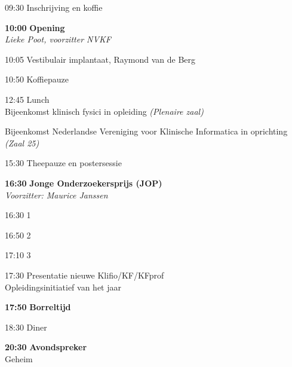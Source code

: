 \documentclass[a4paper,10pt]{report}
\begin{document}
\begin{multicols*}{3}

\begin{packed_enum}
    \item[09:30] Inschrijving en koffie
        \vfill
    \item[\textbf{10:00}] \textbf{Opening}\\\textit{Lieke Poot, voorzitter NVKF}
        \vfill
    \item[10:05] Vestibulair implantaat, Raymond van de Berg
        \vfill
    \item[10:50] Koffiepauze
        \vfill
    \item[{\color{Blue}{\textbf{11:20}}}] {}
        \vfill
    \item[12:45] Lunch\\
        {\small Bijeenkomst klinisch fysici in opleiding \hfill\textit{(Plenaire zaal)}}\\
        {\small Bijeenkomst Nederlandse Vereniging voor Klinische Informatica
        in oprichting \hfill\textit{(Zaal 25)}\strut}
        \vfill
    \item[{\color{Blue}{\textbf{14:00}}}] {}
        \vfill
    \item[15:30] Theepauze en postersessie 
        \vfill
    \item[\textbf{16:30}] {\textbf{Jonge Onderzoekersprijs (JOP)}}\\\textit{Voorzitter: Maurice Janssen}
    \item[16:30] 1
    \item[16:50] 2
    \item[17:10] 3
        \vfill
    \item[17:30] Presentatie nieuwe Klifio/KF/KFprof\\Opleidingsinitiatief van het jaar
        \vfill
    \item[\textbf{17:50}] {\textbf{Borreltijd}}
        \vfill
    \item[18:30] Diner
        \vfill
    \item[\textbf{20:30}] {\textbf{Avondspreker}}\\Geheim
\end{packed_enum}



\begin{packed_enum}


\end{packed_enum}
\end{multicols*}
\end{document}
